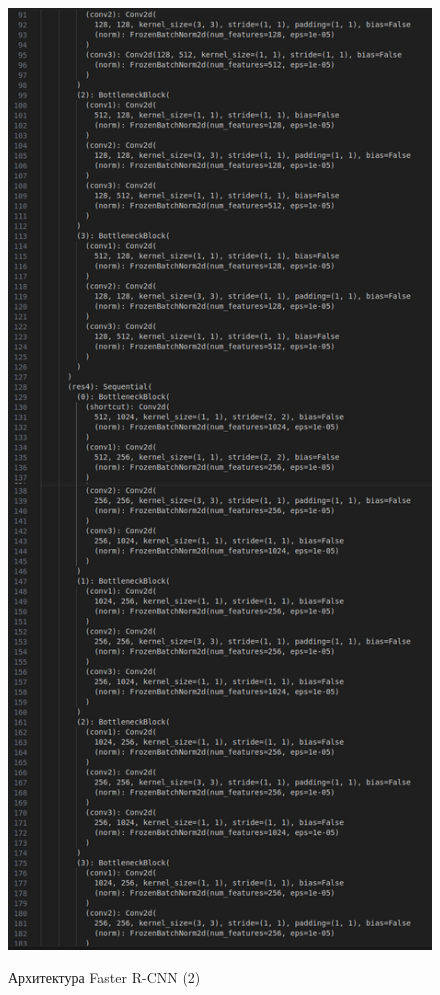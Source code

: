 \begin{figure}[h!]
	\begin{center}
	\includegraphics [scale=0.35]{my_folder/images/arch34}
	\label{fig:arch34}
	\end{center}
	\caption{Архитектура Faster R-CNN (2)}
\end{figure}
